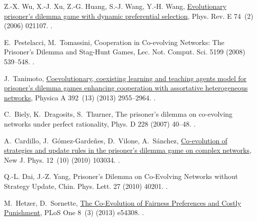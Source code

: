 \documentclass[5p,review]{elsarticle}
\begin{document}
\begin{thebibliography}{10}
Z.-X. Wu, X.-J. Xu, Z.-G. Huang, S.-J. Wang, Y.-H. Wang,
  \href{http://link.aps.org/doi/10.1103/PhysRevE.74.021107}{{Evolutionary
  prisoner's dilemma game with dynamic preferential selection}}, Phys. Rev. E
  74~(2) (2006) 021107.
\newblock \href {http://dx.doi.org/10.1103/PhysRevE.74.021107}
  {}.

E.~Pestelacci, M.~Tomassini, {Cooperation in Co-evolving Networks: The
  Prisoner's Dilemma and Stag-Hunt Games}, Lec. Not. Comput. Sci. 5199 (2008)
  539--548.
\newblock \href {https://doi.org/10.1007/978-3-540-87700-4_54}
  {}.

J.~Tanimoto,
  \href{http://linkinghub.elsevier.com/retrieve/pii/S037843711300143X}{{Coevolutionary, coexisting learning and teaching agents model for prisoner's dilemma games enhancing cooperation with assortative heterogeneous networks}}, Physica A  392~(13) (2013) 2955--2964.
\newblock \href {http://dx.doi.org/10.1016/j.physa.2013.02.004}
  {}.

C.~Biely, K.~Dragosits, S.~Thurner, {The prisoner's dilemma on co-evolving
  networks under perfect rationality}, Phys. D 228 (2007) 40--48.
\newblock \href {https://doi.org/10.1016/j.physd.2007.02.004}
  {}.

A.~Cardillo, J.~G{\'{o}}mez-Garde{\~{n}}es, D.~Vilone, A.~S{\'{a}}nchez,
  \href{http://stacks.iop.org/1367-2630/12/i=10/a=103034?key=crossref.f5fe682f9345deaac915263aad03a325}{{Co-evolution
  of strategies and update rules in the prisoner's dilemma game on complex
  networks}}, New J. Phys. 12~(10) (2010) 103034.
\newblock \href {http://dx.doi.org/10.1088/1367-2630/12/10/103034}
  {}.

Q.-L. Dai, J.-Z. Yang, {Prisoner's Dilemma on Co-Evolving Networks without
  Strategy Update}, Chin. Phys. Lett. 27 (2010) 40201.
\newblock \href {http://doi.org/10.1088/0256-307X/27/4/040201}
  {}.

M.~Hetzer, D.~Sornette,
  \href{http://dx.plos.org/10.1371/journal.pone.0054308}{{The Co-Evolution of
  Fairness Preferences and Costly Punishment}}, PLoS One 8~(3) (2013) e54308.
\newblock \href {http://dx.doi.org/10.1371/journal.pone.0054308}
  {}.


\end{thebibliography}
\end{document}
